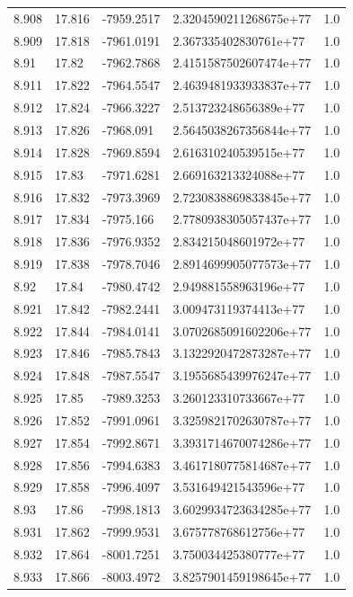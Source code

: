 \begin{tabular}{lllll}
8.908 & 17.816 & -7959.2517 & 2.3204590211268675e+77 & 1.0 \\
8.909 & 17.818 & -7961.0191 & 2.367335402830761e+77 & 1.0 \\
8.91 & 17.82 & -7962.7868 & 2.4151587502607474e+77 & 1.0 \\
8.911 & 17.822 & -7964.5547 & 2.4639481933933837e+77 & 1.0 \\
8.912 & 17.824 & -7966.3227 & 2.513723248656389e+77 & 1.0 \\
8.913 & 17.826 & -7968.091 & 2.5645038267356844e+77 & 1.0 \\
8.914 & 17.828 & -7969.8594 & 2.616310240539515e+77 & 1.0 \\
8.915 & 17.83 & -7971.6281 & 2.669163213324088e+77 & 1.0 \\
8.916 & 17.832 & -7973.3969 & 2.7230838869833845e+77 & 1.0 \\
8.917 & 17.834 & -7975.166 & 2.7780938305057437e+77 & 1.0 \\
8.918 & 17.836 & -7976.9352 & 2.834215048601972e+77 & 1.0 \\
8.919 & 17.838 & -7978.7046 & 2.8914699905077573e+77 & 1.0 \\
8.92 & 17.84 & -7980.4742 & 2.949881558963196e+77 & 1.0 \\
8.921 & 17.842 & -7982.2441 & 3.009473119374413e+77 & 1.0 \\
8.922 & 17.844 & -7984.0141 & 3.0702685091602206e+77 & 1.0 \\
8.923 & 17.846 & -7985.7843 & 3.1322920472873287e+77 & 1.0 \\
8.924 & 17.848 & -7987.5547 & 3.1955685439976247e+77 & 1.0 \\
8.925 & 17.85 & -7989.3253 & 3.260123310733667e+77 & 1.0 \\
8.926 & 17.852 & -7991.0961 & 3.3259821702630787e+77 & 1.0 \\
8.927 & 17.854 & -7992.8671 & 3.3931714670074286e+77 & 1.0 \\
8.928 & 17.856 & -7994.6383 & 3.4617180775814687e+77 & 1.0 \\
8.929 & 17.858 & -7996.4097 & 3.531649421543596e+77 & 1.0 \\
8.93 & 17.86 & -7998.1813 & 3.6029934723634285e+77 & 1.0 \\
8.931 & 17.862 & -7999.9531 & 3.675778768612756e+77 & 1.0 \\
8.932 & 17.864 & -8001.7251 & 3.750034425380777e+77 & 1.0 \\
8.933 & 17.866 & -8003.4972 & 3.8257901459198645e+77 & 1.0 \\

\end{tabular}
